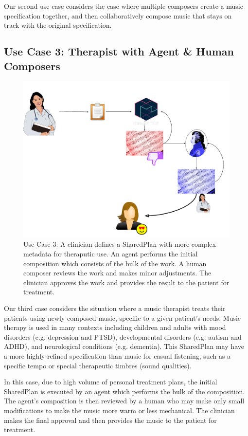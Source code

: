\documentclass[final,authoryear,5p,times,twocolumn]{elsarticle}
\begin{document}
Our second use case considers the case where multiple composers create a music specification together, and then collaboratively compose music that stays on track with the original specification.

\subsection{Use Case 3: Therapist with Agent \& Human Composers}

\begin{figure}
	\includegraphics[scale=0.35]{clinical.pdf}
	\caption{Use Case 3: A clinician defines a SharedPlan with more complex metadata for theraputic use. An agent performs the initial composition which consists of the bulk of the work.	A human composer reviews the work and makes minor adjustments. The clinician approves the work and provides the result to the patient for treatment.}
	\label{fig:clinical}
\end{figure}

Our third case considers the situation where a music therapist treats their patients using newly composed music, specific to a given patient's needs. Music therapy is used in many contexts including children and adults with mood disorders (e.g. depression and PTSD), developmental disorders (e.g. autism and ADHD), and neurological conditions (e.g. dementia). This SharedPlan may have a more highly-refined specification than music for casual listening, such as a specific tempo or special therapeutic timbres (sound qualities). 

In this case, due to high volume of personal treatment plans, the initial SharedPlan is executed by an agent which performs the bulk of the composition. The agent's composition is then reviewed by a human who may make only small modifications to make the music more warm or less mechanical. The clinician makes the final approval and then provides the music to the patient for treatment.
\end{document}
